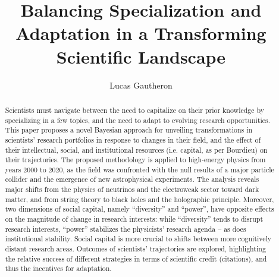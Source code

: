 \documentclass{article}
\title{Balancing Specialization and Adaptation in a Transforming Scientific Landscape}
\author{Lucas Gautheron}
\date{}
\begin{document}
\maketitle

\begin{abstract}
    Scientists must navigate between the need to capitalize on their prior knowledge by specializing in a few topics, and the need to adapt to evolving research opportunities. This paper proposes a novel Bayesian approach for unveiling transformations in scientists' research portfolios in response to changes in their field, and the effect of their intellectual, social, and institutional resources (i.e. capital, as per Bourdieu) on their trajectories. The proposed methodology is applied to high-energy physics from years 2000 to 2020, as the field was confronted with the null results of a major particle collider and the emergence of new astrophysical experiments. The analysis reveals major shifts from the physics of neutrinos and the electroweak sector toward dark matter, and from string theory to black holes and the holographic principle. Moreover, two dimensions of social capital, namely ``diversity'' and ``power'', have opposite effects on the magnitude of change in research interests: while ``diversity'' tends to disrupt research interests, ``power'' stabilizes the physicists' research agenda -- as does institutional stability. Social capital is more crucial to shifts between more cognitively distant research areas. Outcomes of scientists' trajectories are explored, highlighting the relative success of different strategies in terms of scientific credit (citations), and thus the incentives for adaptation.
\end{abstract}




\end{document}
